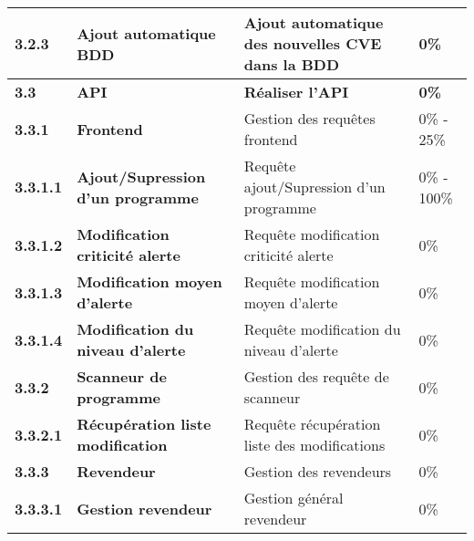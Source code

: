 \begin{supertabular}{|p{2.8cm} p{6cm}|p{5cm}|R{2cm}|}
  \hspace{6pt}
  \textbf{3.2.3}  & \textbf{Ajout automatique BDD} & Ajout automatique des nouvelles CVE dans la BDD & 0\% \\
  \hline



  \textbf{3.3}  & \textbf{API} & \textbf{Réaliser l'API} & \textbf{0\%} \\
  \hline

  \hspace{6pt}
  \textbf{3.3.1}  & \textbf{Frontend} & Gestion des requêtes frontend & 0\% - 25\% \\
  \hline

  \hspace{12pt}
  \textbf{3.3.1.1}  & \textbf{Ajout/Supression d'un programme} & Requête ajout/Supression d'un programme  & 0\% - 100\% \\
  \hline

  \hspace{12pt}
  \textbf{3.3.1.2}  & \textbf{Modification criticité alerte} & Requête modification criticité alerte & 0\% \\
  \hline

  \hspace{12pt}
  \textbf{3.3.1.3}  & \textbf{Modification moyen d'alerte} & Requête modification moyen d'alerte  & 0\% \\
  \hline

  \hspace{12pt}
  \textbf{3.3.1.4}  & \textbf{Modification du niveau d'alerte} & Requête modification du niveau d'alerte  & 0\% \\
  \hline


  \hspace{6pt}
  \textbf{3.3.2}  & \textbf{Scanneur de programme} & Gestion des requête de scanneur & 0\% \\
  \hline

  \hspace{12pt}
  \textbf{3.3.2.1}  & \textbf{Récupération liste modification} & Requête récupération liste des modifications  & 0\% \\
  \hline


  \hspace{6pt}
  \textbf{3.3.3}  & \textbf{Revendeur} & Gestion des revendeurs & 0\% \\
  \hline

  \hspace{12pt}
  \textbf{3.3.3.1}  & \textbf{Gestion revendeur} & Gestion général revendeur  & 0\% \\
  \hline


\end{supertabular}
